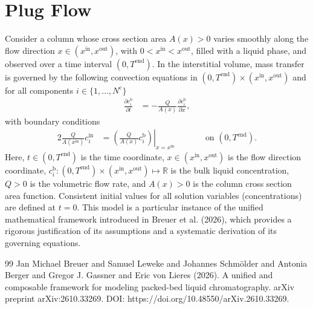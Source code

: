 \documentclass{article}
\begin{document}
\section*{Plug Flow}
Consider a column whose cross section area $A(x) > 0$ varies smoothly along the flow direction $x \in (x^{\mathrm{in}}, x^{\mathrm{out}})$, with $0 < x^{\mathrm{in}} < x^{\mathrm{out}}$, filled with a liquid phase, and observed over a time interval $(0, T^{\mathrm{end}})$.
In the interstitial volume, mass transfer is governed by the following convection equations in $(0, T^{\mathrm{end}})\times (x^{\mathrm{in}}, x^{\mathrm{out}})$ and for all components $i\in\{1, \dots, N^{\mathrm{c}} \}$
\begin{align}
    \frac{\partial c^{\mathrm{b}}_{i}}{\partial t}
    &= - \frac{Q}{A(x)} \frac{\partial c^{\mathrm{b}}_{i}}{\partial x},
\end{align}
with boundary conditions
\begin{alignat}{2}
    \frac{Q}{A(x^{\mathrm{in}})} c^{\mathrm{in}}_{i}
    &= \left.\left( \frac{Q}{A(x)} c^{\mathrm{b}}_{i} \right)\right|_{x=x^{\mathrm{in}}}
    & & \qquad\text{on }(0, T^{\mathrm{end}}).
\end{alignat}
Here, $t\in (0, T^{\mathrm{end}})$ is the time coordinate, $x\in (x^{\mathrm{in}}, x^{\mathrm{out}})$ is the flow direction coordinate, $c^{\mathrm{b}}_{i}\colon (0, T^{\mathrm{end}})\times (x^{\mathrm{in}}, x^{\mathrm{out}}) \mapsto \mathbb{R}$ is the bulk liquid concentration, $Q> 0$ is the volumetric flow rate, and $A(x) > 0$ is the column cross section area function.
Consistent initial values for all solution variables (concentrations) are defined at $t = 0$.
This model is a particular instance of the unified mathematical framework introduced in Breuer et al. (2026), which provides a rigorous justification of its assumptions and a systematic derivation of its governing equations.
\begin{thebibliography}{99}
     Jan Michael Breuer and Samuel Leweke and Johannes Schmölder and Antonia Berger and Gregor J. Gassner and Eric von Lieres (2026). A unified and composable framework for modeling packed-bed liquid chromatography. arXiv preprint arXiv:2610.33269. DOI: https://doi.org/10.48550/arXiv.2610.33269.
\end{thebibliography}
\end{document}
